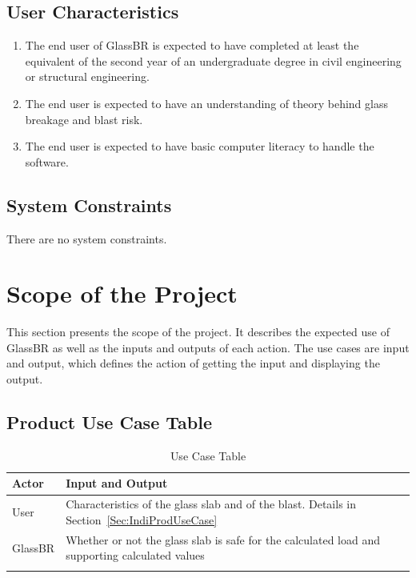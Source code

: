 \documentclass[12pt]{article}
\begin{document}
\subsection{User Characteristics}
\label{Sec:UserChar}
\begin{enumerate}
\item{The end user of GlassBR is expected to have completed at least the equivalent of the second year of an undergraduate degree in civil engineering or structural engineering.}
\item{The end user is expected to have an understanding of theory behind glass breakage and blast risk.}
\item{The end user is expected to have basic computer literacy to handle the software.}
\end{enumerate}
\subsection{System Constraints}
\label{Sec:SystCons}
There are no system constraints.
\section{Scope of the Project}
\label{Sec:ScopoftheProj}
This section presents the scope of the project. It describes the expected use of GlassBR as well as the inputs and outputs of each action. The use cases are input and output, which defines the action of getting the input and displaying the output.
\subsection{Product Use Case Table}
\label{Sec:ProdUseCaseTabl}
\begin{longtabu}{l X[l]}
\toprule
Actor & Input and Output
\\
\midrule
User & Characteristics of the glass slab and of the blast. Details in Section~\ref{Sec:IndiProdUseCase}
\\
GlassBR & Whether or not the glass slab is safe for the calculated load and supporting calculated values
\\
\bottomrule
\caption{Use Case Table}
\label{Table:UseCaseTabl}
\end{longtabu}
\end{document}
